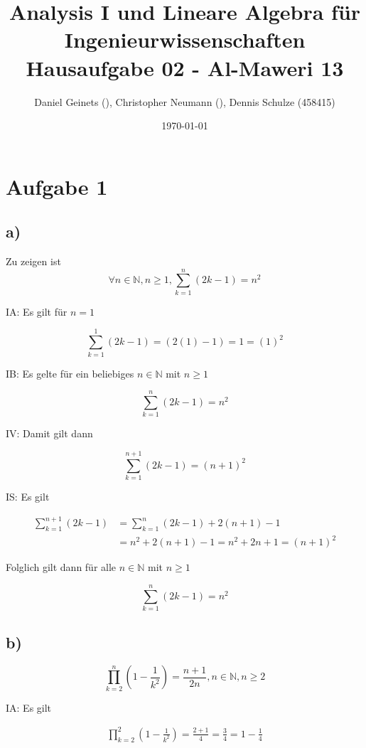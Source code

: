 \documentclass[a4paper, 11pt]{article}
\author{Daniel Geinets (), Christopher Neumann (), Dennis Schulze (458415)}
\date{\today}
\title{Analysis I und Lineare Algebra für Ingenieurwissenschaften \large  \\ Hausaufgabe 02 - Al-Maweri 13}
\begin{document}
\maketitle
\tableofcontents

\setcounter{secnumdepth}{0}
\newcommand{\tuple}[1]{\left(#1\right)}
\newcommand{\R}{\mathbb{R}}
\newcommand{\Q}{\mathbb{Q}}
\newcommand{\N}{\mathbb{N}}
\newcommand{\C}{\mathbb{C}}

\pagebreak

\section{Aufgabe 1}
\label{sec:org172840d}
\subsection{a)}
\label{sec:org8f22a02}
Zu zeigen ist
$$ \forall n \in \N, n \geq 1, \sum_{k=1}^{n} \tuple{2k - 1} = n^2 $$

IA:
    Es gilt für \(n = 1\)

$$ \sum_{k=1}^{1} \tuple{2k - 1} = (2(1) - 1) = 1 = (1)^2 $$

IB:
    Es gelte für ein beliebiges \(n \in \N\) mit \(n \geq 1\)

$$ \sum_{k=1}^{n} \tuple{2k - 1} = n^2 $$

IV:
    Damit gilt dann

$$ \sum_{k=1}^{n+1} \tuple{2k - 1} = (n + 1)^2 $$

IS:
    Es gilt

\begin{align*}
    \sum_{k=1}^{n+1} \tuple{2k - 1} &= \sum_{k=1}^{n} \tuple{2k - 1} + 2(n + 1) - 1 \\
    &= n^2 + 2(n + 1) - 1 = n^2 + 2n + 1 = (n + 1)^2
\end{align*}

Folglich gilt dann für alle \(n \in \N\) mit \(n \geq 1\)

$$ \sum_{k=1}^{n} \tuple{2k - 1} = n^2 $$

\subsection{b)}
\label{sec:org2c2a4ac}
$$ \prod_{k=2}^{n} \tuple{1 - \frac{1}{k^2}} = \frac{n + 1}{2n}, n \in \N, n \geq 2 $$

IA:
  Es gilt

\begin{align*}
    \prod_{k = 2}^{2} \tuple{1 - \frac{1}{k^2}} = \frac{2 + 1}{4}
    = \frac{3}{4}
    = 1 - \frac{1}{4}
\end{align*}
\end{document}
